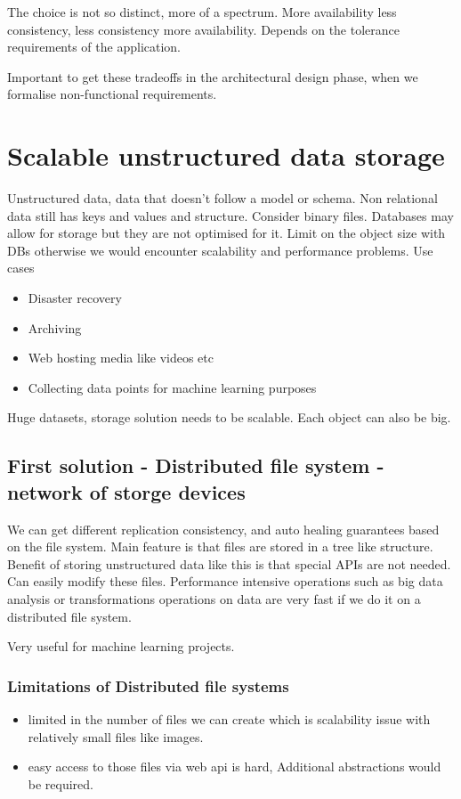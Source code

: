 The choice is not so distinct, more of a spectrum.
More availability less consistency, less consistency more availability.
Depends on the tolerance requirements of the application.

Important to get these tradeoffs in the architectural design phase, when we formalise non-functional requirements.


\section{Scalable unstructured data storage}
Unstructured data, data that doesn't follow a model or schema.
Non relational data still has keys and values and structure.
Consider binary files.
Databases may allow for storage but they are not optimised for it.
Limit on the object size with DBs otherwise we would encounter scalability and performance problems.
Use cases
\begin{itemize}
    \item Disaster recovery
    \item Archiving
    \item Web hosting media like videos etc
    \item Collecting data points for machine learning purposes
\end{itemize}

Huge datasets, storage solution needs to be scalable.
Each object can also be big.

\subsection{First solution - Distributed file system - network of storge devices}
We can get different replication consistency, and auto healing guarantees based on the file system.
Main feature is that files are stored in a tree like structure.
Benefit of storing unstructured data like this is that special APIs are not needed.
Can easily modify these files.
Performance intensive operations such as big data analysis or transformations operations on data are very fast if we do it on a distributed file system.
\begin{note}
    Very useful for machine learning projects.
\end{note}

\subsubsection{Limitations of Distributed file systems}
\begin{itemize}
    \item limited in the number of files we can create which is scalability issue with relatively small files like images.
    \item easy access to those files via web api is hard, Additional abstractions would be required.
\end{itemize}

